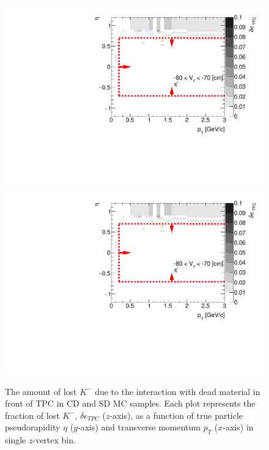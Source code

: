 \begin{figure}[H]
	\caption[The amount of lost $K^-$ due to the interaction with dead material in front of TPC as a function of $p_T$, $\eta$ and $z$-vertex in CD and SD]{The amount of lost $K^-$ due to the interaction with dead material in front of TPC in CD and SD MC samples. Each plot represents the fraction of lost $K^-$, $\delta\epsilon_{ TPC}$ ($z$-axis), as a function of true particle pseudorapidity $\eta$ ($y$-axis) and transverse momentum $p_{T}$ ($x$-axis) in single $z$-vertex bin.}\label{fig:dead_materialCDSD3DKm}
	\parbox{0.325\textwidth}{
		\includegraphics[width=\linewidth,page=17]{graphics/systematicsEfficiency/deadMaterial/secondaries_Unbinned_SDCD_.pdf}\\
		\includegraphics[width=\linewidth,page=20]{graphics/systematicsEfficiency/deadMaterial/secondaries_Unbinned_SDCD_.pdf}\\
}
\end{figure}
